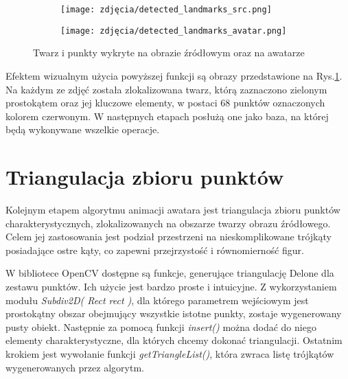 \begin{figure}[h]
	\centering
	\begin{subfigure}{0.35\textwidth}
		\centering
		\texttt{[image: zdjęcia/detected\_landmarks\_src.png]}
		\subcaption{\label{detected_landmarks_src}}
	\end{subfigure}
	\begin{subfigure}{0.35\textwidth}
		\centering
		\texttt{[image: zdjęcia/detected\_landmarks\_avatar.png]}
		\subcaption{\label{detected_landmarks_avatar}}
	\end{subfigure}
	
	\caption{\label{fig:detectedLandmarks}Twarz i punkty wykryte na obrazie źródłowym \protect{} oraz na awatarze \protect{}}
\end{figure}

Efektem wizualnym użycia powyższej funkcji są obrazy przedstawione na Rys.\ref{fig:detectedLandmarks}. Na każdym ze zdjęć została zlokalizowana twarz, którą zaznaczono zielonym prostokątem oraz jej kluczowe elementy, w postaci 68 punktów oznaczonych kolorem czerwonym. W następnych etapach posłużą one jako baza, na której będą wykonywane wszelkie operacje. 



\section{Triangulacja zbioru punktów}
Kolejnym etapem algorytmu animacji awatara jest triangulacja zbioru punktów charakterystycznych, zlokalizowanych na obszarze twarzy obrazu źródłowego. Celem jej zastosowania jest podział przestrzeni na nieskomplikowane trójkąty posiadające ostre kąty, co zapewni przejrzystość i równomierność figur.

W bibliotece OpenCV dostępne są funkcje, generujące triangulację Delone dla zestawu punktów. Ich użycie jest bardzo proste i intuicyjne. Z wykorzystaniem modułu \textit{Subdiv2D( Rect rect )}, dla którego parametrem wejściowym jest prostokątny obszar obejmujący wszystkie istotne punkty, zostaje wygenerowany pusty obiekt. Następnie za pomocą funkcji \textit{insert()} można dodać do niego elementy charakterystyczne, dla których chcemy dokonać triangulacji. Ostatnim krokiem jest wywołanie funkcji \textit{getTriangleList()}, która zwraca listę trójkątów wygenerowanych przez algorytm. 

